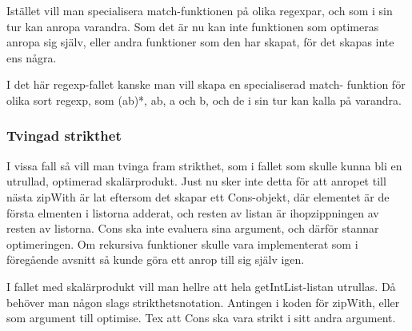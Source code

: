 \documentclass[Rapport]{subfiles}
\begin{document}
    Istället vill man specialisera match-funktionen på olika regexpar, och
som i sin tur kan anropa varandra. Som det är nu kan inte funktionen som
optimeras anropa sig själv, eller andra funktioner som den har skapat,
för det skapas inte ens några.

    I det här regexp-fallet kanske man vill skapa en specialiserad match-
funktion för olika sort regexp, som (ab)*, ab, a och b, och de i sin tur
kan kalla på varandra.

\subsubsection{Tvingad strikthet}

I vissa fall så vill man tvinga fram strikthet, som i fallet 
 som skulle kunna bli en utrullad,
optimerad skalärprodukt. Just nu sker inte detta för att anropet till nästa
zipWith är lat eftersom det skapar ett Cons-objekt, där elementet är de första
elmenten i listorna adderat, och resten av listan är ihopzippningen av resten
av listorna. Cons ska inte evaluera sina argument, och därför stannar
optimeringen. Om rekursiva funktioner skulle vara implementerat som i föregående
avsnitt så kunde göra ett anrop till sig själv igen.

    I fallet med skalärprodukt vill man hellre att hela getIntList-listan 
utrullas. Då behöver man någon slags strikthetsnotation. Antingen i koden 
för zipWith, eller som argument till optimise. Tex att Cons ska vara strikt i 
sitt andra argument.
\end{document}
